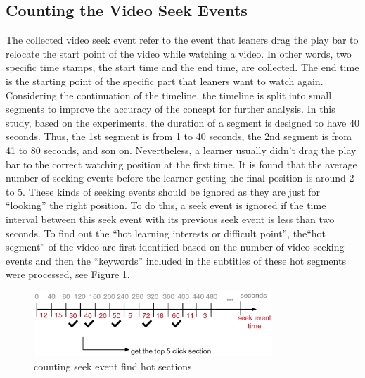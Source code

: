 \subsection{Counting the Video Seek Events}
The collected video seek event refer to the event that leaners drag the play bar to relocate the start point of the video while watching a video. In other words, two specific time stamps, the start time and the end time, are collected. The end time is the starting point of the specific part that leaners want to watch again.
Considering the continuation of the timeline, the timeline is split into small segments to improve the accuracy of the concept for further analysis. In this study, based on the experiments, the duration of a segment is designed to have 40 seconds. Thus, the 1st segment is from 1 to 40 seconds, the 2nd segment is from 41 to 80 seconds, and son on.
Nevertheless, a learner usually didn’t drag the play bar to the correct watching position at the first time. It is found that the average number of seeking events before the learner getting the final position is around 2 to 5. These kinds of seeking events should be ignored as they are just for “looking” the right position. To do this, a seek event is ignored if the time interval between this seek event with its previous seek event is less than two seconds.
To find out the ``hot learning interests or difficult point'', the``hot segment'' of the video are first identified based on the number of video seeking events and then the ``keywords'' included in the subtitles of these hot segments were processed, see Figure \ref{fig:countseek}.

\begin{figure}[H]
    \centering
    \includegraphics[width = 0.8\textwidth]{fig/countseek.eps}
    \caption{counting seek event find hot sections}
    \label{fig:countseek}
\end{figure}

